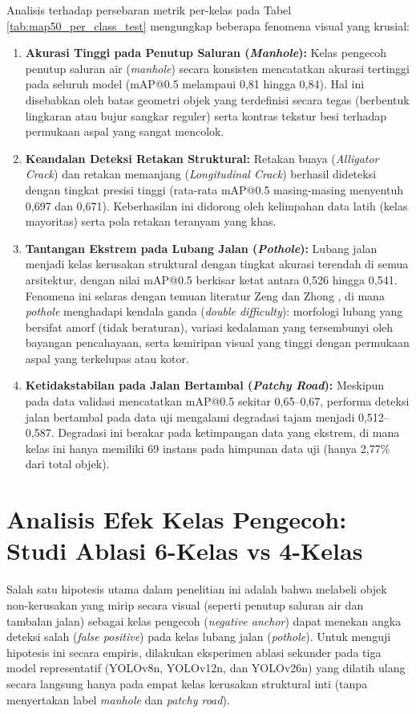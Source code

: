 Analisis terhadap persebaran metrik per-kelas pada Tabel \ref{tab:map50_per_class_test} mengungkap beberapa fenomena visual yang krusial:
\begin{enumerate}
	\item \textbf{Akurasi Tinggi pada Penutup Saluran (\textit{Manhole}):} Kelas pengecoh penutup saluran air (\textit{manhole}) secara konsisten mencatatkan akurasi tertinggi pada seluruh model (mAP@0.5 melampaui 0,81 hingga 0,84). Hal ini disebabkan oleh batas geometri objek yang terdefinisi secara tegas (berbentuk lingkaran atau bujur sangkar reguler) serta kontras tekstur besi terhadap permukaan aspal yang sangat mencolok.
	\item \textbf{Keandalan Deteksi Retakan Struktural:} Retakan buaya (\textit{Alligator Crack}) dan retakan memanjang (\textit{Longitudinal Crack}) berhasil dideteksi dengan tingkat presisi tinggi (rata-rata mAP@0.5 masing-masing menyentuh 0,697 dan 0,671). Keberhasilan ini didorong oleh kelimpahan data latih (kelas mayoritas) serta pola retakan teranyam yang khas.
	\item \textbf{Tantangan Ekstrem pada Lubang Jalan (\textit{Pothole}):} Lubang jalan menjadi kelas kerusakan struktural dengan tingkat akurasi terendah di semua arsitektur, dengan nilai mAP@0.5 berkisar ketat antara 0,526 hingga 0,541. Fenomena ini selaras dengan temuan literatur Zeng dan Zhong \cite{Zeng2024}, di mana \textit{pothole} menghadapi kendala ganda (\textit{double difficulty}): morfologi lubang yang bersifat amorf (tidak beraturan), variasi kedalaman yang tersembunyi oleh bayangan pencahayaan, serta kemiripan visual yang tinggi dengan permukaan aspal yang terkelupas atau kotor.
	\item \textbf{Ketidakstabilan pada Jalan Bertambal (\textit{Patchy Road}):} Meskipun pada data validasi mencatatkan mAP@0.5 sekitar 0,65--0,67, performa deteksi jalan bertambal pada data uji mengalami degradasi tajam menjadi 0,512--0,587. Degradasi ini berakar pada ketimpangan data yang ekstrem, di mana kelas ini hanya memiliki 69 instans pada himpunan data uji (hanya 2,77\% dari total objek).
\end{enumerate}

\section{Analisis Efek Kelas Pengecoh: Studi Ablasi 6-Kelas vs 4-Kelas}
\label{sec:analisis_distractor}

Salah satu hipotesis utama dalam penelitian ini adalah bahwa melabeli objek non-kerusakan yang mirip secara visual (seperti penutup saluran air dan tambalan jalan) sebagai kelas pengecoh (\textit{negative anchor}) dapat menekan angka deteksi salah (\textit{false positive}) pada kelas lubang jalan (\textit{pothole}). Untuk menguji hipotesis ini secara empiris, dilakukan eksperimen ablasi sekunder pada tiga model representatif (YOLOv8n, YOLOv12n, dan YOLOv26n) yang dilatih ulang secara langsung hanya pada empat kelas kerusakan struktural inti (tanpa menyertakan label \textit{manhole} dan \textit{patchy road}).

